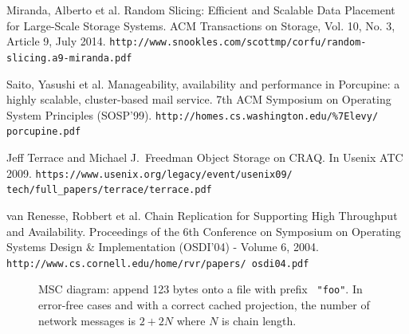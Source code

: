 \documentclass[preprint,10pt]{sigplanconf}
\begin{document}
\begin{thebibliography}{}
Miranda, Alberto et al.
Random Slicing: Efficient and Scalable Data Placement for Large-Scale Storage Systems.
ACM Transactions on Storage, Vol. 10, No. 3, Article 9, July 2014.
{\tt http://www.snookles.com/scottmp/corfu/random- slicing.a9-miranda.pdf}

Saito, Yasushi et al.
Manageability, availability and performance in Porcupine: a highly scalable, cluster-based mail service.
7th ACM Symposium on Operating System Principles (SOSP’99).
{\tt http://homes.cs.washington.edu/\%7Elevy/ porcupine.pdf}

Jeff Terrace and Michael J.~Freedman
Object Storage on CRAQ.
In Usenix ATC 2009.
{\tt https://www.usenix.org/legacy/event/usenix09/ tech/full\_papers/terrace/terrace.pdf}

van Renesse, Robbert et al.
Chain Replication for Supporting High Throughput and Availability.
Proceedings of the 6th Conference on Symposium on Operating Systems
Design \& Implementation (OSDI'04) - Volume 6, 2004.
{\tt http://www.cs.cornell.edu/home/rvr/papers/ osdi04.pdf}

\end{thebibliography}



\begin{figure}[tp]
\caption{MSC diagram: append 123 bytes onto a file with prefix {\tt
    "foo"}. In error-free cases and with a correct cached projection, the
  number of network messages is $2 + 2N$ where $N$ is chain length.}
\label{fig:append-flowMSC}
\end{figure}
\end{document}
